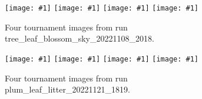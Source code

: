 \documentclass[letterpaper]{article}
\newcommand{\runID}{\footnotesize}
\newcommand{\igfour}[1]{\texttt{[image: \#1]}}
\begin{document}

\begin{figure}[t]
    \igfour{20221108_2018_step_4655.png}
    \hfill
    \igfour{20221108_2018_step_5498.png}
    \hfill
    \igfour{20221108_2018_step_5947.png}
    \hfill
    \igfour{20221108_2018_step_6562.png}
    \caption{Four tournament images from run {\runID tree\_leaf\_blossom\_sky\_20221108\_2018}.}
    \label{fig:tree_leaf_blossom_sky_4x}
\end{figure}

\begin{figure}[t]
    \igfour{20221121_1819_step_6324.png}
    \hfill
    \igfour{20221121_1819_step_6464.png}
    \hfill
    \igfour{20221121_1819_step_6677.png}
    \hfill
    \igfour{20221121_1819_step_6755.png}
    \caption{Four tournament images from run {\runID plum\_leaf\_litter\_20221121\_1819}.}
    \label{fig:plum_leaf_litter_4x}
\end{figure}

\end{document}
